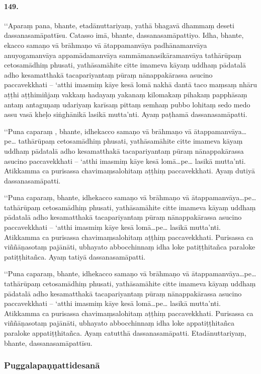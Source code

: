 \paragraph{149.} ‘‘Aparaṃ pana, bhante, etadānuttariyaṃ, yathā bhagavā dhammaṃ deseti dassanasamāpattīsu. Catasso imā, bhante, dassanasamāpattiyo. Idha, bhante, ekacco samaṇo vā brāhmaṇo vā ātappamanvāya padhānamanvāya anuyogamanvāya appamādamanvāya sammāmanasikāramanvāya tathārūpaṃ cetosamādhiṃ phusati, yathāsamāhite citte imameva kāyaṃ uddhaṃ pādatalā adho kesamatthakā tacapariyantaṃ pūraṃ nānappakārassa asucino paccavekkhati – ‘atthi imasmiṃ kāye kesā lomā nakhā dantā taco maṃsaṃ nhāru aṭṭhi aṭṭhimiñjaṃ vakkaṃ hadayaṃ yakanaṃ kilomakaṃ pihakaṃ papphāsaṃ antaṃ antaguṇaṃ udariyaṃ karīsaṃ pittaṃ semhaṃ pubbo lohitaṃ sedo medo assu vasā kheḷo siṅghānikā lasikā mutta’nti. Ayaṃ paṭhamā dassanasamāpatti.

‘‘Puna caparaṃ , bhante, idhekacco samaṇo vā brāhmaṇo vā ātappamanvāya…pe… tathārūpaṃ cetosamādhiṃ phusati, yathāsamāhite citte imameva kāyaṃ uddhaṃ pādatalā adho kesamatthakā tacapariyantaṃ pūraṃ nānappakārassa asucino paccavekkhati – ‘atthi imasmiṃ kāye kesā lomā…pe… lasikā mutta’nti. Atikkamma ca purisassa chavimaṃsalohitaṃ aṭṭhiṃ paccavekkhati. Ayaṃ dutiyā dassanasamāpatti.

‘‘Puna caparaṃ, bhante, idhekacco samaṇo vā brāhmaṇo vā ātappamanvāya…pe… tathārūpaṃ cetosamādhiṃ phusati, yathāsamāhite citte imameva kāyaṃ uddhaṃ pādatalā adho kesamatthakā tacapariyantaṃ pūraṃ nānappakārassa asucino paccavekkhati – ‘atthi imasmiṃ kāye kesā lomā…pe… lasikā mutta’nti. Atikkamma ca purisassa chavimaṃsalohitaṃ aṭṭhiṃ paccavekkhati. Purisassa ca viññāṇasotaṃ pajānāti, ubhayato abbocchinnaṃ idha loke patiṭṭhitañca paraloke patiṭṭhitañca. Ayaṃ tatiyā dassanasamāpatti.

‘‘Puna caparaṃ, bhante, idhekacco samaṇo vā brāhmaṇo vā ātappamanvāya…pe… tathārūpaṃ cetosamādhiṃ phusati, yathāsamāhite citte imameva kāyaṃ uddhaṃ pādatalā adho kesamatthakā tacapariyantaṃ pūraṃ nānappakārassa asucino paccavekkhati – ‘atthi imasmiṃ kāye kesā lomā…pe… lasikā mutta’nti. Atikkamma ca purisassa chavimaṃsalohitaṃ aṭṭhiṃ paccavekkhati. Purisassa ca viññāṇasotaṃ pajānāti, ubhayato abbocchinnaṃ idha loke appatiṭṭhitañca paraloke appatiṭṭhitañca. Ayaṃ catutthā dassanasamāpatti. Etadānuttariyaṃ, bhante, dassanasamāpattīsu.

\subsubsection{Puggalapaṇṇattidesanā}

